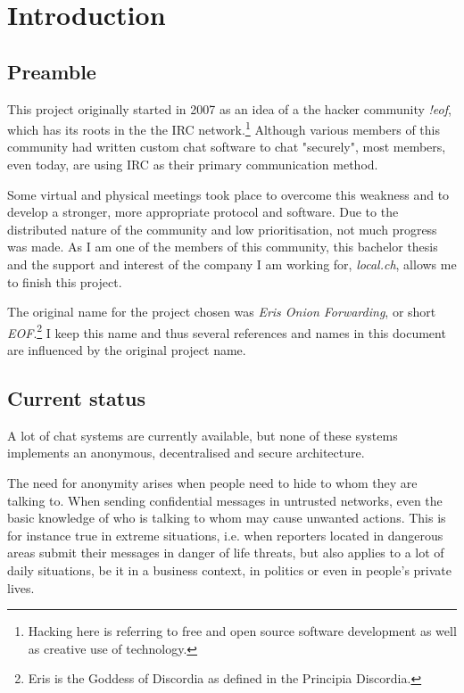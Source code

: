 \chapter{Introduction}
\section{Preamble}
This project originally started in 2007 as an idea of a the hacker
community \textit{!eof}, which has its roots in the the IRC
network.\footnote{Hacking here is referring to free and open source
software development as well as creative use of technology.}
Although various members of this community had written custom chat software
to chat "securely", most members, even today, are using IRC as their
primary communication method.

Some virtual and physical meetings took place to overcome this weakness
and to develop a stronger, more appropriate protocol and software.
Due to the distributed nature of the community and low prioritisation, not
much progress was made. As I am one of the members of this community,
this bachelor thesis and the support and interest
of the company I am working for, \textit{local.ch}, allows me to finish
this project.

The original name for the project chosen was \textit{Eris Onion Forwarding}, or
short \textit{EOF}.\footnote{Eris is the Goddess of Discordia as defined
in the Principia Discordia.}
I keep this name and thus several references and names
in this document are influenced by the original project name.
\section{Current status}
A lot of chat systems are currently available, 
but none of these systems implements an anonymous, decentralised and secure architecture.

The need for anonymity arises when people need to hide to whom they are talking to. 
When sending confidential messages 
in untrusted networks, even the basic knowledge of who is talking to whom may 
cause unwanted actions.
This is for instance true in extreme situations, i.e. when reporters located in 
dangerous areas submit their messages in danger of life threats, but also 
applies to a lot of daily situations, be it in a business context,
in politics or even in people's private lives. 

